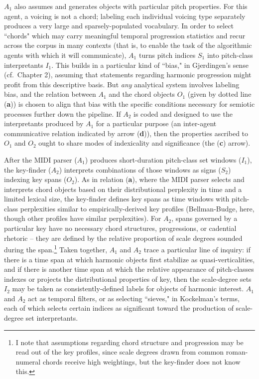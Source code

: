 $A_1$ also assumes and generates objects with particular pitch properties.  For this agent, a voicing is not a chord; labeling each individual voicing type separately produces a very large and sparsely-populated vocabulary.  In order to select ``chords"  which may carry meaningful temporal progression statistics and recur across the corpus in many contexts (that is, to enable the task of the algorithmic agents with which it will communicate), $A_1$ turns pitch indices $S_1$ into pitch-class interpretants $I_1$.  This builds in a particular kind of ``bias," in Gjerdingen's sense (cf.\ Chapter 2), assuming that statements regarding harmonic progression might profit from this descriptive basis.  But \emph{any} analytical system involves labeling bias, and the relation between $A_1$ and the chord objects $O_1$ (given by dotted line (\textbf{a})) is chosen to align that bias with the specific conditions necessary for semiotic processes further down the pipeline.  If $A_2$ is coded and designed to use the interpretants produced by $A_1$ for a particular purpose (an inter-agent communicative relation indicated by arrow (\textbf{d})), then the properties ascribed to $O_1$ and $O_2$ ought to share modes of indexicality and significance (the (\textbf{c}) arrow).

After the MIDI parser ($A_1$) produces short-duration pitch-class set windows ($I_1$), the key-finder ($A_2$) interprets combinations of those windows as signs ($S_2$) indexing key spans ($O_2$).  As in relation (\textbf{a}), where the MIDI parser selects and interprets chord objects based on their distributional perplexity in time and a limited lexical size, the key-finder defines key spans as time windows with pitch-class perplexities similar to empirically-derived key profiles (Bellman-Budge, here, though other profiles have similar perplexities).  For $A_2$, spans governed by a particular key have no necessary chord structures, progressions, or cadential rhetoric -- they are defined by the relative proportion of scale degrees sounded during the span.\footnote{I note that assumptions regarding chord structure and progression may be read out of the key profiles, since scale degrees drawn from common roman-numeral chords receive high weightings, but the key-finder does not know this.}  Taken together, $A_1$ and $A_2$ trace a particular line of inquiry: if there is a time span at which harmonic objects first stabilize as quasi-verticalities, and if there is another time span at which the relative appearance of pitch-classes indexes or projects the distributional properties of key, then the scale-degree sets $I_2$ may be taken as consistently-defined labels for objects of harmonic interest.  $A_1$ and $A_2$ act as temporal filters, or as selecting ``sieves," in Kockelman's terms, each of which selects certain indices as significant toward the production of scale-degree set interpretants.

